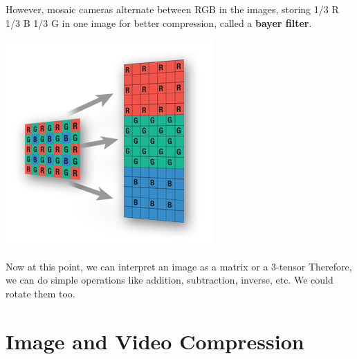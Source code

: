 \documentclass{article}
\begin{document}
    However, mosaic cameras alternate between RGB in the images, storing 1/3 R 1/3 B 1/3 G in one image for better compression, called a \textbf{bayer filter}. 
    \begin{center}
        \includegraphics[scale=0.3]{img/bayer_filter.png}
    \end{center}

    Now at this point, we can interpret an image as a matrix or a 3-tensor Therefore, we can do simple operations like addition, subtraction, inverse, etc. We could rotate them too. 

\section{Image and Video Compression}
\end{document}
